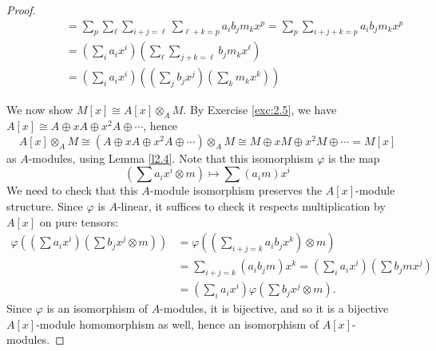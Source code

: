 \documentclass[12pt,letterpaper]{article}
\theoremstyle{definition}
\theoremstyle{remark}
\numberwithin{figure}{problem}
\numberwithin{equation}{section}
\begin{document}
\begin{proof}
\begin{align*}
    &\qquad\qquad= \sum_p \sum_\ell \sum_{i+j=\ell} \sum_{\ell+k=p} a_ib_jm_kx^p = \sum_p \sum_{i+j+k=p} a_ib_jm_kx^p\\
    &\qquad\qquad= \left( \sum_i a_ix^i \right) \left( \sum_\ell \sum_{j+k=\ell} b_jm_kx^\ell \right)\\
    &\qquad\qquad= \left( \sum_i a_ix^i \right) \left( \left(\sum_j b_jx^j \right)\left( \sum_k m_kx^k \right) \right)
  \end{align*}
  \par We now show $M[x] \cong A[x] \otimes_A M$. By Exercise \ref{exc:2.5}, we have $A[x] \cong A \oplus xA \oplus x^2A \oplus \cdots$, hence
  \begin{equation*}
    A[x] \otimes_A M \cong (A \oplus xA \oplus x^2A \oplus \cdots) \otimes_A M \cong M \oplus xM \oplus x^2M \oplus \cdots = M[x]
  \end{equation*}
  as $A$-modules, using Lemma \ref{l2.4}. Note that this isomorphism $\varphi$ is the map 
  \begin{equation*}
    \left(\sum a_ix^i \otimes m\right) \mapsto \sum (a_im)x^i
  \end{equation*}
  We need to check that this $A$-module isomorphism preserves the $A[x]$-module structure. Since $\varphi$ is $A$-linear, it suffices to check it respects multiplication by $A[x]$ on pure tensors:
  \begin{align*}
    \varphi\left(\left(\sum a_ix^i\right)\left(\sum b_jx^j \otimes m\right)\right) &= \varphi\left(\left( \sum_{i+j=k} a_ib_jx^k \right) \otimes m\right)\\
    &= \sum_{i+j=k} (a_ib_jm)x^k = \left(\sum_i a_ix^i\right)\left(\sum b_jmx^j\right)\\
    &= \left(\sum_i a_ix^i\right) \varphi\left( \sum b_jx^j \otimes m \right).
  \end{align*}
  Since $\varphi$ is an isomorphism of $A$-modules, it is bijective, and so it is a bijective $A[x]$-module homomorphism as well, hence an isomorphism of $A[x]$-modules.

\end{proof}
\end{document}
